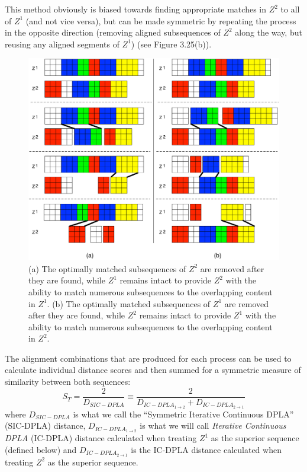 \documentclass[a4paper,12pt]{report} 	%
\numberwithin{figure}{chapter}
\numberwithin{table}{chapter}
\numberwithin{equation}{chapter}
\begin{document}
\begin{flushleft}
This method obviously is biased towards finding appropriate matches in $Z^2$ to all of $Z^1$ (and not vice versa), but can be made symmetric by repeating the process in the opposite direction (removing aligned subsequences of $Z^2$ along the way, but reusing any aligned segments of $Z^1$) (see Figure 3.25(b)). 
\begin{figure}[h!]
\begin{center}
\includegraphics[width=\linewidth]{GreedyMatching4}
\caption[Asymmetric Greedy Removal After Matching in Both Directions]{(a) The optimally matched subsequences of $Z^2$ are removed after they are found, while $Z^1$ remains intact to provide $Z^2$ with the ability to match numerous subsequences to the overlapping content in $Z^1$. (b) The optimally matched subsequences of $Z^1$ are removed after they are found, while $Z^2$ remains intact to provide $Z^1$ with the ability to match numerous subsequences to the overlapping content in $Z^2$.}
\end{center}
\end{figure}
The alignment combinations that are produced for each process can be used to calculate individual distance scores and then summed for a symmetric measure of similarity between both sequences:
\begin{equation}
S_T = \frac{2}{D_{SIC-DPLA}} \equiv \frac{2}{D_{IC-DPLA_{1\to2}} + D_{IC-DPLA_{2\to1}}}
\end{equation}
where $D_{SIC-DPLA}$ is what we call the ``Symmetric Iterative Continuous DPLA'' (SIC-DPLA) distance, $D_{IC-DPLA_{1\to2}}$ is what we will call \emph{Iterative Continuous DPLA} (IC-DPLA) distance calculated when treating $Z^1$ as the superior sequence (defined below) and $D_{IC-DPLA_{2\to1}}$ is the IC-DPLA distance calculated when treating $Z^2$ as the superior sequence.


\end{flushleft}
\end{document}
